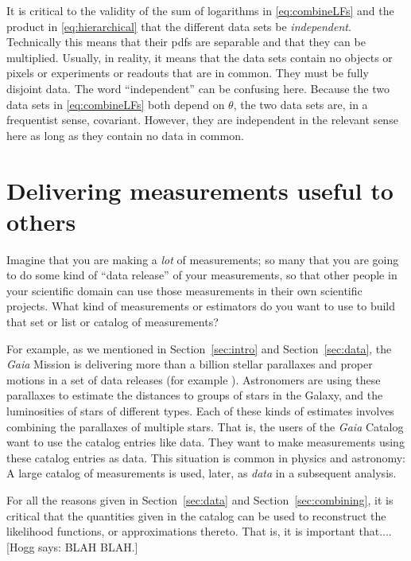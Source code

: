 \documentclass{article}
\newcommand{\sectionname}{Section}
\newcommand{\secref}[1]{\sectionname~\ref{#1}}
\newcommand{\hogg}[1]{{\color{blue}[Hogg says: {#1}]}}
\begin{document}
It is critical to the validity of the sum of logarithms in \eqref{eq:combineLFs} and the product in \eqref{eq:hierarchical}
that the different data sets be \emph{independent}.
Technically this means that their pdfs are separable and that they can be multiplied.
Usually, in reality, it means that the data sets contain no objects or pixels or experiments or readouts that are in common.
They must be fully disjoint data.
The word ``independent'' can be confusing here.
Because the two data sets in \eqref{eq:combineLFs} both depend on $\theta$, the two data sets are, in a frequentist sense, covariant.
However, they are independent in the relevant sense here as long as they contain no data in common.

\section{Delivering measurements useful to others}\label{sec:catalogs}
Imagine that you are making a \emph{lot} of measurements; so many that you are going to do some kind of ``data release'' of your measurements, so that other people in your scientific domain can use those measurements in their own scientific projects.
What kind of measurements or estimators do you want to use to build that set or list or catalog of measurements?

For example, as we mentioned in \secref{sec:intro} and \secref{sec:data}, the \textsl{Gaia} Mission \cite{gaia} is delivering more than a billion stellar parallaxes and proper motions in a set of data releases (for example \cite{gaiadr3}).
Astronomers are using these parallaxes to estimate the distances to groups of stars in the Galaxy, and the luminosities of stars of different types.
Each of these kinds of estimates involves combining the parallaxes of multiple stars.
That is, the users of the \textsl{Gaia} Catalog want to use the catalog entries like data.
They want to make measurements using these catalog entries as data.
This situation is common in physics and astronomy:
A large catalog of measurements is used, later, as \emph{data} in a subsequent analysis.

For all the reasons given in \secref{sec:data} and \secref{sec:combining}, it is critical that the quantities given in the catalog can be used to reconstruct the likelihood functions, or approximations thereto.
That is, it is important that....
\hogg{BLAH BLAH.}
\end{document}

